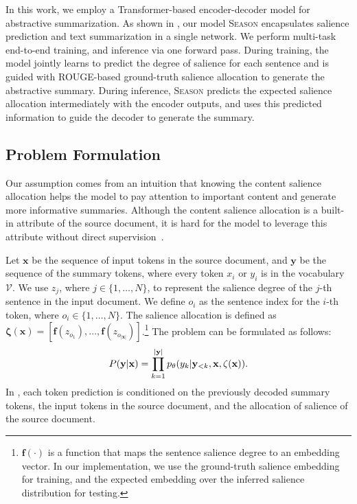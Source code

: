 \documentclass[11pt]{article}
\newcommand{\MODEL}{\mbox{\textsc{Season}}\xspace}
\begin{document}
In this work, we employ a Transformer-based encoder-decoder model for abstractive summarization.
As shown in , our model \MODEL encapsulates salience prediction and text summarization in a single network.
We perform multi-task end-to-end training, and inference via one forward pass.
During training, the model jointly learns to predict the degree of salience for each sentence and is guided with ROUGE-based ground-truth salience allocation to generate the abstractive summary. 
During inference, \MODEL predicts the expected salience allocation intermediately with the encoder outputs, and uses this predicted information to guide the decoder to generate the summary.

\subsection{Problem Formulation}
Our assumption comes from an intuition that knowing the content salience allocation helps the model to pay attention to important content and generate more informative summaries.
Although the content salience allocation is a built-in attribute of the source document, it is hard for the model to leverage this attribute without direct supervision~\cite{li2020keywords,saito2020abstractive,dou2021gsum}.

Let $\mathbf{x}$ be the sequence of input tokens in the source document, and $\mathbf{y}$ be the sequence of the summary tokens, where every token $x_i$ or $y_i$ is in the vocabulary $\mathbf{\mathcal{V}}$.
We use $z_j$, where $j \in \{1, \dots, N\}$, to represent the salience degree of the $j$-th sentence in the input document.
We define $o_{i}$ as the sentence index for the $i$-th token, where $o_{i} \in \{1, \dots, N\}$.
The salience allocation is defined as $\mathbf{\zeta}(\mathbf{x}) =[\mathbf{f}(z_{o_1}), \dots, \mathbf{f}(z_{o_{|\mathbf{x}|}})]$.\footnote{$\mathbf{f}(\cdot)$ is a function that maps the sentence salience degree to an embedding vector. In our implementation, we use the ground-truth salience embedding for training, and the expected embedding over the inferred salience distribution for testing.}
The problem can be formulated as follows:
\vspace{-1mm}
\begin{equation}
    P(\mathbf{y}|\mathbf{x}) = \prod_{k=1}^{|\mathbf{y}|}{p_{\theta}(y_{k}|\mathbf{y}_{<k}, \mathbf{x}, \mathbf{\zeta}(\mathbf{x}))} .
    \label{eq:formulation}
    \vspace{-1mm}
\end{equation}
In , each token prediction is conditioned on the previously decoded summary tokens, the input tokens in the source document, and the allocation of salience of the source document.
\end{document}
